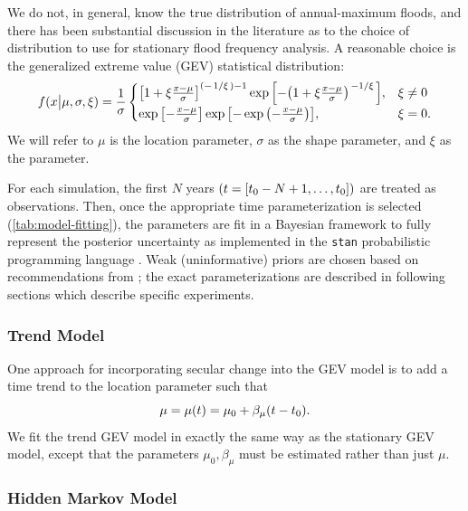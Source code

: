 \documentclass[12pt]{article}
\begin{document}
We do not, in general, know the true distribution of annual-maximum floods, and there has been substantial discussion in the literature as to the choice of distribution to use for stationary flood frequency analysis.
A reasonable choice is the generalized extreme value (GEV) statistical distribution:
\begin{equation}
  \label{eq:GEV}
  f(x \big| \mu, \sigma, \xi) = \frac{1}{\sigma}
    \begin{cases}
      \qty[1 + \xi \frac{x - \mu}{\sigma}] ^ {(-\flatfrac{1}{\xi})-1} \exp \qty[-\qty(1+\xi \frac{x - \mu}{\sigma})^{\flatfrac{-1}{\xi}}], & \xi \neq 0 \\
      \exp \qty[-\frac{x-\mu}{\sigma}] \exp \qty[- \exp \qty(- \frac{x-\mu}{\sigma})], & \xi = 0.
    \end{cases}
\end{equation}
We will refer to \(\mu{}\) is the location parameter, \(\sigma{}\) as the shape parameter, and \( \xi{} \) as the parameter.

For each simulation, the first \(N\) years \(\qty(t=[t_0-N+1, \ldots, t_0])\) are treated as observations.
Then, once the appropriate time parameterization is selected (\cref{tab:model-fitting}), the parameters are fit in a Bayesian framework to fully represent the posterior uncertainty as implemented in the \texttt{stan} probabilistic programming language \citep{Carpenter2016}.
Weak (uninformative) priors are chosen based on recommendations from \citet{Martins2000}; the exact parameterizations are described in following sections which describe specific experiments.

\subsubsection{Trend Model\label{sec:method-trend}}

One approach for incorporating secular change into the GEV model is to add a time trend to the location parameter \citep[\ie{}][]{Bracken2017} such that
\begin{equation*}
  \mu = \mu(t) = \mu_0 + \beta_\mu \qty(t - t_0).
\end{equation*}
We fit the trend GEV model in exactly the same way as the stationary GEV model, except that the parameters  \( \mu_0, \beta_\mu \) must be estimated rather than just \( \mu \).

\subsubsection{Hidden Markov Model\label{sec:method-HMM}}
\end{document}

